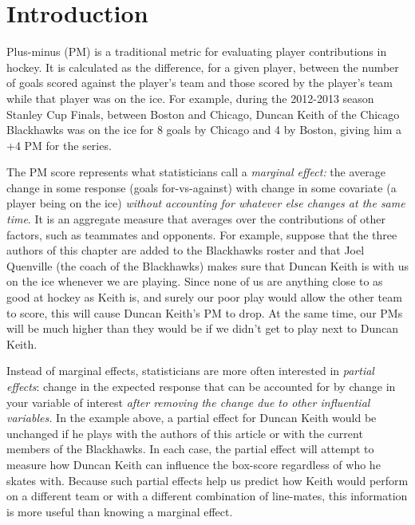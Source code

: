 \section{Introduction}
\label{sec:intro}

Plus-minus (PM) is a traditional metric for evaluating player contributions in
hockey. It is calculated as the difference, for a given player, between the
number of goals scored against the player's team and those scored by the
player's team while that player was on the ice.  For example, during the
2012-2013 season Stanley Cup Finals, between Boston and Chicago, Duncan Keith
of the Chicago Blackhawks was on the ice for 8 goals by Chicago and 4 by
Boston, giving him a +4 PM for the series.

The PM score represents what statisticians call a \textit{marginal effect:}
the average change in some response (goals for-vs-against) with change in some
covariate (a player being on the ice) \textit{without accounting for whatever
else changes at the same time}. It is an aggregate measure that averages over
the contributions of other factors, such as teammates and opponents.   For
example, suppose that the three authors of this chapter are added to the
Blackhawks roster and that Joel Quenville (the coach of the Blackhawks) makes
sure that Duncan Keith is with us on the ice whenever we are playing.  Since
none of us are anything close to as good at hockey as Keith is, and surely our
poor play would allow the other team to score, this will cause Duncan Keith's
PM to drop.  At the same time, our PMs will be much higher than they would be
if we didn't get to play next to Duncan Keith.


Instead of marginal effects, statisticians are more often interested in
\textit{partial effects}: change in the expected response that can be
accounted for by change in your variable of interest \textit{after removing
the change due to other influential variables.} In the example above, a
partial effect for Duncan Keith would be unchanged if he plays with the
authors of this article or with the current members of the Blackhawks.  In
each case, the partial effect will attempt to measure how Duncan Keith can
influence the box-score regardless of who he skates with. Because such partial
effects help us predict how Keith would perform on a different team or with a different
combination of line-mates, this information is more useful than knowing a
marginal effect.  

